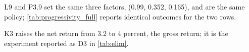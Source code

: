 \begin{table}[!t]
\begin{threeparttable}
\begin{tablenotes}[flushleft]
\item[a] L9 and P3.9 set the same three factors, (0.99, 0.352, 0.165), and are the same policy; \autoref{tab:progressivity_full} reports identical outcomes for the two rows.
\item[b] K3 raises the net return from 3.2 to 4 percent, the gross return; it is the experiment reported as D3 in \autoref{tab:elim}.
\end{tablenotes}
\end{threeparttable}
\end{table}
